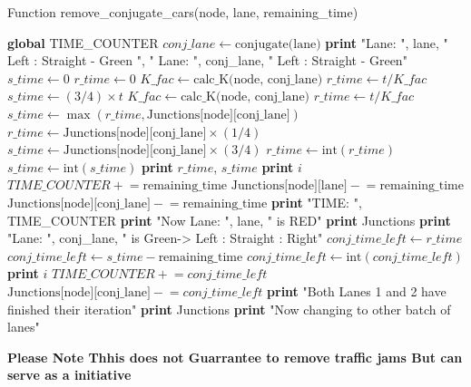 \documentclass{IEEEtran}
\begin{document}
\begin{algorithm}
\caption{Function remove\_conjugate\_cars(node, lane, remaining\_time)}
\begin{algorithmic}[1]
    \State \textbf{global} TIME\_COUNTER
    \State $conj\_lane \gets \text{conjugate(lane)}$
    \State \textbf{print} "Lane: ", lane, " Left : Straight - Green ", " Lane: ", conj\_lane, " Left : Straight - Green"
    \State $s\_time \gets 0$
    \State $r\_time \gets 0$
        \State $K\_fac \gets \text{calc\_K(node, conj\_lane)}$
        \State $r\_time \gets t/K\_fac$
        \State $s\_time \gets (3/4) \times t$
        \State $K\_fac \gets \text{calc\_K(node, conj\_lane)}$
        \State $r\_time \gets t/K\_fac$
        \State $s\_time \gets \max(r\_time, \text{Junctions[node][conj\_lane]})$
    \Else
        \State $r\_time \gets \text{Junctions[node][conj\_lane]} \times (1/4)$
        \State $s\_time \gets \text{Junctions[node][conj\_lane]} \times (3/4)$
        \State $r\_time \gets \text{int}(r\_time)$
        \State $s\_time \gets \text{int}(s\_time)$
    \EndIf
    \State \textbf{print} $r\_time$, $s\_time$
            \State \textbf{print} $i$
        \EndFor
        \State $TIME\_COUNTER \mathrel{+}= \text{remaining\_time}$
        \State $\text{Junctions[node][lane]} \mathrel{-}= \text{remaining\_time}$
        \State $\text{Junctions[node][conj\_lane]} \mathrel{-}= \text{remaining\_time}$
        \State \textbf{print} "TIME: ", TIME\_COUNTER
        \State \textbf{print} "Now Lane: ", lane, " is RED"
        \State \textbf{print} Junctions
        \State \textbf{print} "Lane: ", conj\_lane, " is Green-> Left : Straight : Right"
            \State $conj\_time\_left \gets r\_time$
        \Else
            \State $conj\_time\_left \gets s\_time - \text{remaining\_time}$
        \EndIf
        \State $conj\_time\_left \gets \text{int}(conj\_time\_left)$
            \State \textbf{print} $i$
        \EndFor
        \State $TIME\_COUNTER \mathrel{+}= conj\_time\_left$
        \State $\text{Junctions[node][conj\_lane]} \mathrel{-}= conj\_time\_left$
        \State \textbf{print} "Both Lanes 1 and 2 have finished their iteration"
        \State \textbf{print} Junctions
        \State \textbf{print} "Now changing to other batch of lanes"
    \Else
    \EndIf
\EndProcedure
\end{algorithmic}
\end{algorithm}
\textbf{Please Note Thhis does not Guarrantee to remove traffic jams But can serve as a initiative}
\clearpage
\end{document}
